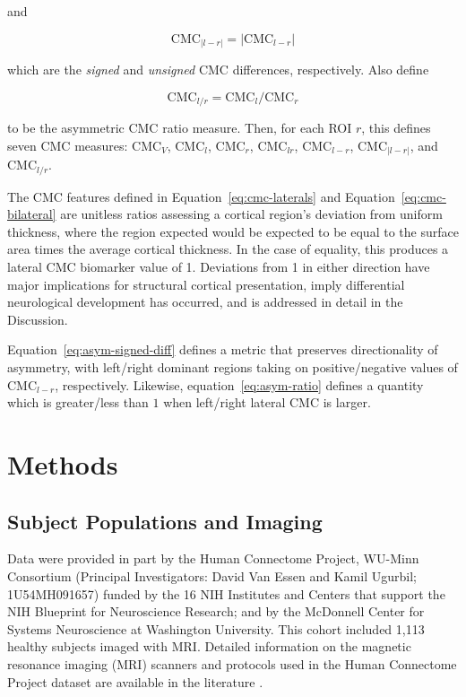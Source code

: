 \documentclass{article}
\begin{document}
and

\begin{equation} \label{eq:asym-unsigned-diff}
\text{CMC}_{|l - r|} = \lvert\text{CMC}_{l - r} \rvert
\end{equation}

which are the \emph{signed} and \emph{unsigned} CMC differences, respectively. Also define

\begin{equation} \label{eq:asym-ratio}
\text{CMC}_{l / r} = \text{CMC}_{l} / \text{CMC}_{r}
\end{equation}

to be the asymmetric CMC ratio measure. Then, for each ROI \(r\), this
defines seven \(\text{CMC}\) measures: \(\text{CMC}_{V}\), \(\text{CMC}_l\),
\(\text{CMC}_r\), \(\text{CMC}_{lr}\), \(\text{CMC}_{l-r}\),
\(\text{CMC}_{\lvert l-r \rvert}\), and \(\text{CMC}_{l / r}\).

The CMC features defined in Equation~\ref{eq:cmc-laterals} and
Equation~\ref{eq:cmc-bilateral} are unitless ratios assessing a cortical
region's deviation from uniform thickness, where the region expected
would be expected to be equal to the surface area times the average cortical
thickness. In the case of equality, this produces a lateral CMC biomarker
value of 1. Deviations from 1 in either direction have major implications for
structural cortical presentation, imply differential neurological development
has occurred, and is addressed in detail in the Discussion.

Equation~\ref{eq:asym-signed-diff} defines a metric that preserves
directionality of asymmetry, with left/right dominant regions taking on
positive/negative values of \(\text{CMC}_{l - r}\), respectively. Likewise,
equation~\ref{eq:asym-ratio} defines a quantity which is greater/less than
\(1\) when left/right lateral \(\text{CMC}\) is larger.

\section{Methods}
\label{sec:methods}
\subsection{Subject Populations and Imaging}
\label{sec:population}

Data were provided in part by the Human Connectome Project, WU-Minn
Consortium (Principal Investigators: David Van Essen and Kamil Ugurbil;
1U54MH091657) funded by the 16 NIH Institutes and Centers that support the
NIH Blueprint for Neuroscience Research; and by the McDonnell Center for
Systems Neuroscience at Washington University. This cohort included 1,113
healthy subjects imaged with MRI\@. Detailed information on the magnetic
resonance imaging (MRI) scanners and protocols used in the Human Connectome
Project dataset are available in the literature
\citep{elamHumanConnectomeProject2021}.
\end{document}
